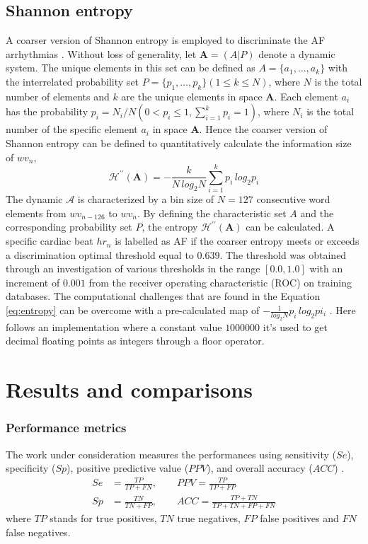 \subsection{Shannon entropy}
\label{sec:entropy}
A coarser version of Shannon entropy is employed to discriminate the AF arrhythmias . Without loss of generality, let $\mathbf{A} = (A|P)$ denote a dynamic system. The unique elements in this set can be defined as $A = \{a_1, \ldots, a_k\}$ with the interrelated probability set $P = \{p_1, \ldots, p_k\} (1 \le k \le N)$, where $N$ is the total number of elements and $k$ are the unique elements in space $\mathbf{A}$. Each element $a_i$ has the probability $p_i = N_i/N (0 < p_i \le 1, \sum_{i=1}^{k}p_i=1)$, where $N_i$ is the total number of the specific element $a_i$ in space $\mathbf{A}$. Hence the coarser version of Shannon entropy can be defined to quantitatively calculate the information size of $wv_n$,
\begin{equation}\label{eq:entropy}
\mathcal{H}^{\prime\prime} (\mathbf{A}) = -\frac{k}{N \, log_2 N} \sum_{i=1}^{k}p_i \, log_2 p_i
\end{equation}
The dynamic $\mathcal{A}$ is characterized by a bin size of $N=127$ consecutive word elements from $wv_{n-126}$ to $wv_n$. By defining the characteristic set $A$ and the corresponding probability set $P$, the entropy $\mathcal{H}^{\prime\prime} (\mathbf{A})$ can be calculated. A specific cardiac beat $hr_n$ is labelled as AF if the coarser entropy meets or exceeds a discrimination optimal threshold equal to $0.639$. The threshold was obtained through an investigation of various thresholds in the range $[0.0, 1.0]$ with an increment of $0.001$ from the receiver operating characteristic (ROC) on training databases. 
The computational challenges that are found in the Equation \ref{eq:entropy} can be overcome with a pre-calculated map of $-\frac{1}{log_2 N}p_i \, log_2 pi_i$ \cite[p. 4]{zhou2015}. Here follows an implementation where a constant value $1000000$ it's used to get decimal floating points as integers through a floor operator.

\section{Results and comparisons}
\subsubsection{Performance metrics}
The work under consideration measures the performances using sensitivity ($Se$), specificity ($Sp$), positive predictive value ($PPV$), and overall accuracy ($ACC$) \cite[p. 6]{zhou2015}.
\begin{equation}
\begin{aligned} S e &=\frac{T P}{T P+F N},\qquad P P V=\frac{T P}{T P+F P} \\ S p &=\frac{T N}{T N+F P}, \qquad A C C=\frac{T P+T N}{T P+T N+F P+F N} \end{aligned}
\end{equation}
where $TP$ stands for true positives, $TN$ true negatives, $FP$ false positives and $FN$ false negatives.

